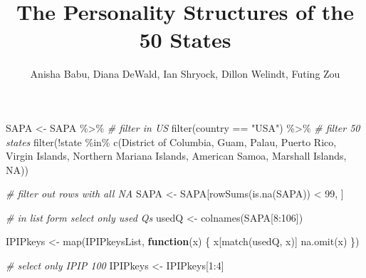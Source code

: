 \documentclass[
]{article}
\title{The Personality Structures of the 50 States}
\author{Anisha Babu, Diana DeWald, Ian Shryock, Dillon Welindt, Futing Zou}
\date{}
\newenvironment{Shaded}{\begin{snugshade}}{\end{snugshade}}
\newcommand{\CommentTok}[1]{\textcolor[rgb]{0.56,0.35,0.01}{\textit{#1}}}
\newcommand{\ConstantTok}[1]{\textcolor[rgb]{0.00,0.00,0.00}{#1}}
\newcommand{\ControlFlowTok}[1]{\textcolor[rgb]{0.13,0.29,0.53}{\textbf{#1}}}
\newcommand{\DecValTok}[1]{\textcolor[rgb]{0.00,0.00,0.81}{#1}}
\newcommand{\FunctionTok}[1]{\textcolor[rgb]{0.00,0.00,0.00}{#1}}
\newcommand{\NormalTok}[1]{#1}
\newcommand{\OtherTok}[1]{\textcolor[rgb]{0.56,0.35,0.01}{#1}}
\newcommand{\SpecialCharTok}[1]{\textcolor[rgb]{0.00,0.00,0.00}{#1}}
\newcommand{\StringTok}[1]{\textcolor[rgb]{0.31,0.60,0.02}{#1}}
\begin{document}
\maketitle

{
\setcounter{tocdepth}{2}
\tableofcontents
}
\renewcommand{\thetable}{\arabic{table}} 
\renewcommand{\thefigure}{\arabic{figure}}


\newpage

\listoftables

\newpage

\begin{Shaded}
\begin{Highlighting}[]
\NormalTok{SAPA }\OtherTok{\textless{}{-}}\NormalTok{ SAPA }\SpecialCharTok{\%\textgreater{}\%}
  \CommentTok{\# filter in US}
  \FunctionTok{filter}\NormalTok{(country }\SpecialCharTok{==} \StringTok{"USA"}\NormalTok{) }\SpecialCharTok{\%\textgreater{}\%}
  \CommentTok{\# filter 50 states}
  \FunctionTok{filter}\NormalTok{(}\SpecialCharTok{!}\NormalTok{state }\SpecialCharTok{\%in\%} \FunctionTok{c}\NormalTok{(}\StringTok{\textquotesingle{}District of Columbia\textquotesingle{}}\NormalTok{, }
                       \StringTok{\textquotesingle{}Guam\textquotesingle{}}\NormalTok{, }
                       \StringTok{\textquotesingle{}Palau\textquotesingle{}}\NormalTok{,}
                       \StringTok{\textquotesingle{}Puerto Rico\textquotesingle{}}\NormalTok{, }
                       \StringTok{\textquotesingle{}Virgin Islands\textquotesingle{}}\NormalTok{,}
                       \StringTok{\textquotesingle{}Northern Mariana Islands\textquotesingle{}}\NormalTok{, }
                       \StringTok{\textquotesingle{}American Samoa\textquotesingle{}}\NormalTok{, }
                       \StringTok{\textquotesingle{}Marshall Islands\textquotesingle{}}\NormalTok{, }
                       \ConstantTok{NA}\NormalTok{)) }

\CommentTok{\# filter out rows with all NA}
\NormalTok{SAPA }\OtherTok{\textless{}{-}}\NormalTok{ SAPA[}\FunctionTok{rowSums}\NormalTok{(}\FunctionTok{is.na}\NormalTok{(SAPA)) }\SpecialCharTok{\textless{}} \DecValTok{99}\NormalTok{, ]}

\CommentTok{\# in list form select only used Q\textquotesingle{}s}
\NormalTok{usedQ }\OtherTok{\textless{}{-}} \FunctionTok{colnames}\NormalTok{(SAPA[}\DecValTok{8}\SpecialCharTok{:}\DecValTok{106}\NormalTok{])}

\NormalTok{IPIPkeys }\OtherTok{\textless{}{-}} \FunctionTok{map}\NormalTok{(IPIPkeysList, }\ControlFlowTok{function}\NormalTok{(x) \{}
\NormalTok{    x[}\FunctionTok{match}\NormalTok{(usedQ, x)]}
    \FunctionTok{na.omit}\NormalTok{(x)}
\NormalTok{\})}

\CommentTok{\# select only IPIP 100}
\NormalTok{IPIPkeys }\OtherTok{\textless{}{-}}\NormalTok{ IPIPkeys[}\DecValTok{1}\SpecialCharTok{:}\DecValTok{4}\NormalTok{]}
\end{Highlighting}
\end{Shaded}
\end{document}
